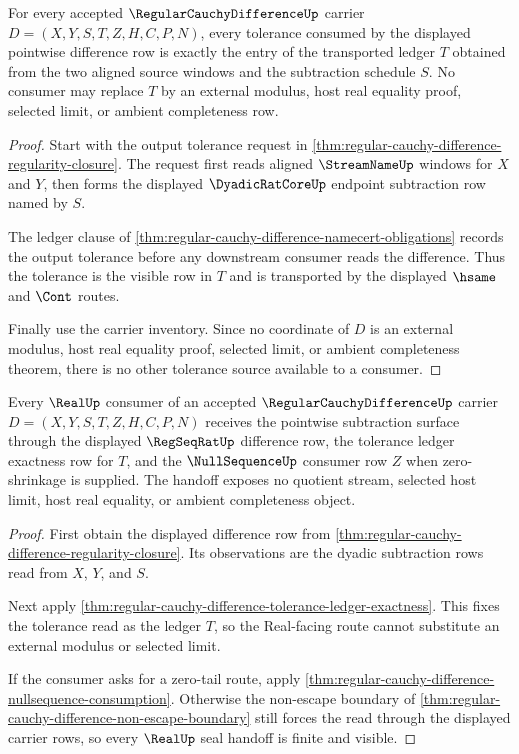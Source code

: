 \begin{theorem}
\label{thm:regular-cauchy-difference-tolerance-ledger-exactness}
For every accepted $\RegularCauchyDifferenceUp$ carrier $D=(X,Y,S,T,Z,H,C,P,N)$, every tolerance consumed by the displayed pointwise difference row is exactly the entry of the transported ledger $T$ obtained from the two aligned source windows and the subtraction schedule $S$. No consumer may replace $T$ by an external modulus, host real equality proof, selected limit, or ambient completeness row.
\end{theorem}
\begin{proof}
Start with the output tolerance request in \autoref{thm:regular-cauchy-difference-regularity-closure}. The request first reads aligned $\StreamNameUp$ windows for $X$ and $Y$, then forms the displayed $\DyadicRatCoreUp$ endpoint subtraction row named by $S$.

The ledger clause of \autoref{thm:regular-cauchy-difference-namecert-obligations} records the output tolerance before any downstream consumer reads the difference. Thus the tolerance is the visible row in $T$ and is transported by the displayed $\hsame$ and $\Cont$ routes.

Finally use the carrier inventory. Since no coordinate of $D$ is an external modulus, host real equality proof, selected limit, or ambient completeness theorem, there is no other tolerance source available to a consumer.
\end{proof}

\begin{theorem}
\label{thm:regular-cauchy-difference-real-seal-handoff}
Every $\RealUp$ consumer of an accepted $\RegularCauchyDifferenceUp$ carrier $D=(X,Y,S,T,Z,H,C,P,N)$ receives the pointwise subtraction surface through the displayed $\RegSeqRatUp$ difference row, the tolerance ledger exactness row for $T$, and the $\NullSequenceUp$ consumer row $Z$ when zero-shrinkage is supplied. The handoff exposes no quotient stream, selected host limit, host real equality, or ambient completeness object.
\end{theorem}
\begin{proof}
First obtain the displayed difference row from \autoref{thm:regular-cauchy-difference-regularity-closure}. Its observations are the dyadic subtraction rows read from $X$, $Y$, and $S$.

Next apply \autoref{thm:regular-cauchy-difference-tolerance-ledger-exactness}. This fixes the tolerance read as the ledger $T$, so the Real-facing route cannot substitute an external modulus or selected limit.

If the consumer asks for a zero-tail route, apply \autoref{thm:regular-cauchy-difference-nullsequence-consumption}. Otherwise the non-escape boundary of \autoref{thm:regular-cauchy-difference-non-escape-boundary} still forces the read through the displayed carrier rows, so every $\RealUp$ seal handoff is finite and visible.
\end{proof}


